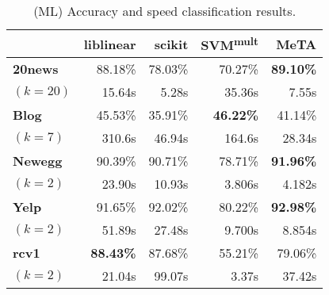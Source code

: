 \begin{table}[t]
\centering
{\small
\begin{tabular}{|l|r|r|r|r|}
  \hline
  & \textbf{liblinear} & \textbf{scikit} &
  \textbf{SVM\textsuperscript{mult}} & \textbf{MeTA}\\\hline
  \textbf{20news}                    & 88.18\%          & 78.03\%  & 70.27\%          & \textbf{89.10\%}\\
  $(k=20)$                           & 15.64s           & 5.28s    & 35.36s           & 7.55s\\\hline
  \textbf{Blog}                      & 45.53\%          & 35.91\%  & \textbf{46.22\%} & 41.14\%\\
  $(k=7)$                            & 310.6s           & 46.94s   & 164.6s           & 28.34s\\\hline
  \textbf{Newegg}                    & 90.39\%          & 90.71\%  & 78.71\%          & \textbf{91.96\%}\\
  $(k=2)$                            & 23.90s           & 10.93s   & 3.806s           & 4.182s\\\hline
  \textbf{Yelp}                      & 91.65\%          & 92.02\%  & 80.22\%          & \textbf{92.98\%}\\
  $(k=2)$                            & 51.89s           & 27.48s   & 9.700s           & 8.854s\\\hline
  \textbf{rcv1}                      & \textbf{88.43\%} & 87.68\%  & 55.21\%          & 79.06\%\\
  $(k=2)$                            & 21.04s           & 99.07s   & 3.37s            & 37.42s\\\hline
\end{tabular}
}
\caption{(ML) Accuracy and speed classification results.}
\label{table:ml-exp}
\end{table}
